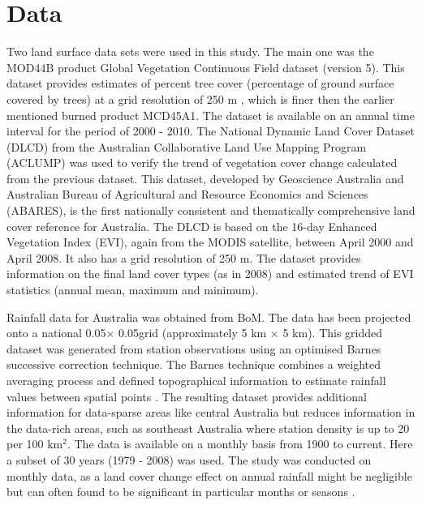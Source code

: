 \documentclass[onecolumn,referee]{svjour3}
\begin{document}
\section{Data}
\label{sec:Data}

Two land surface data sets were used in this study. The main one was the MOD44B product Global Vegetation Continuous Field dataset (version 5). This dataset provides estimates of percent tree cover (percentage of ground surface covered by trees) at a grid resolution of 250 m \citep{Townshend2011}, which is finer then the earlier mentioned burned product MCD45A1. The dataset is available on an annual time interval for the period of 2000 - 2010. The National Dynamic Land Cover Dataset (DLCD) \citep{Lymburner2010} from the Australian Collaborative Land Use Mapping Program (ACLUMP) was used to verify the trend of vegetation cover change calculated from the previous dataset. This dataset, developed by Geoscience Australia and Australian Bureau of Agricultural and Resource Economics and Sciences (ABARES), is the first nationally consistent and thematically comprehensive land cover reference for Australia. The DLCD is based on the 16-day Enhanced Vegetation Index (EVI), again from the MODIS satellite, between April 2000 and April 2008. It also has a grid resolution of 250 m. The dataset provides information on the final land cover types (as in 2008) and estimated trend of EVI statistics (annual mean, maximum and minimum). 

Rainfall data for Australia \citep{Jones2009} was obtained from BoM. The data has been projected onto a national 0.05\textdegree $\times$ 0.05\textdegree grid (approximately 5 km $\times$ 5 km). This gridded dataset was generated from station observations using an optimised Barnes successive correction technique. The Barnes technique combines a weighted averaging process and defined topographical information to estimate rainfall values between spatial points \citep{BoM2009}. The resulting dataset provides additional information for data-sparse areas like central Australia but reduces information in the data-rich areas, such as southeast Australia where station density is up to 20 per 100 km$^2$. The data is available on a monthly basis from 1900 to current. Here a subset of 30 years (1979 - 2008) was used. The study was conducted on monthly data, as a land cover change effect on annual rainfall might be negligible but can often found to be significant in particular months or seasons \citep[e.g.][]{Otterman1990,Gaertner2001,Semazzi2001,Oleson2004,Deo2009}. 
\end{document}
